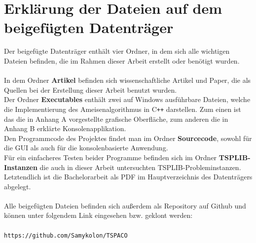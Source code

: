 \documentclass[doktyp=barbeit, sprache=german]{TUBAFarbeiten}
\begin{document}
\section{Erklärung der Dateien auf dem beigefügten Datenträger}
Der beigefügte Datenträger enthält vier Ordner, in dem sich alle wichtigen Dateien befinden, die im Rahmen dieser Arbeit erstellt oder benötigt wurden.
\\\\In dem Ordner \textbf{Artikel} befinden sich wissenschaftliche Artikel und Paper, die als Quellen bei der Erstellung dieser Arbeit benutzt wurden. 
\\Der Ordner \textbf{Executables} enthält zwei auf Windows ausführbare Dateien, welche die Implementierung des Ameisenalgorithmus in C\texttt{++} darstellen. Zum einen ist das die in Anhang A vorgestellte grafische Oberfläche, zum anderen die in Anhang B erklärte Konsolenapplikation.
\\Den Programmcode des Projektes findet man im Ordner \textbf{Sourcecode}, sowohl für die GUI als auch für die konsolenbasierte Anwendung.
\\Für ein einfacheres Testen beider Programme befinden sich im Ordner \textbf{TSPLIB-Instanzen} die auch in dieser Arbeit untersuchten TSPLIB-Probleminstanzen.
\\Letztendlich ist die Bachelorarbeit als PDF im Hauptverzeichnis des Datenträgers abgelegt.
\\\\Alle beigefügten Dateien befinden sich außerdem als Repository auf Github und können unter folgendem Link eingesehen bzw. geklont werden:
\\\\\texttt{https://github.com/Samykolon/TSPACO}
\newpage
\listoffigures
\listoftables
\newpage
{}
\newpage
{}
\end{document}
